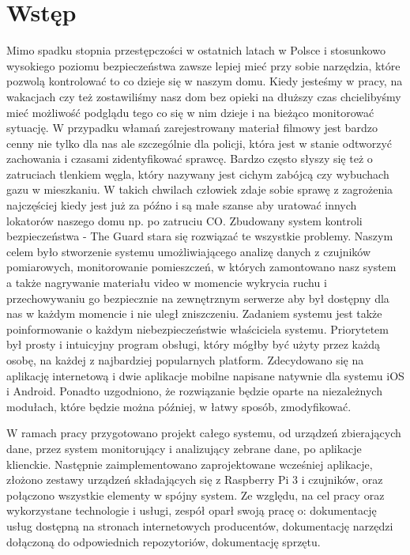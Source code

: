 \chapter{Wstęp}
Mimo spadku stopnia przestępczości w ostatnich latach w Polsce i stosunkowo wysokiego poziomu bezpieczeństwa zawsze lepiej mieć przy sobie narzędzia, które pozwolą kontrolować to co dzieje się w naszym domu. Kiedy jesteśmy w pracy, na wakacjach czy też zostawiliśmy nasz dom bez opieki na dłuższy czas chcielibyśmy mieć możliwość podglądu tego co się w nim dzieje i na bieżąco monitorować sytuację. W przypadku włamań zarejestrowany materiał filmowy jest bardzo cenny nie tylko dla nas ale szczególnie dla policji, która jest w stanie odtworzyć zachowania i czasami zidentyfikować sprawcę.  Bardzo często słyszy się też o zatruciach tlenkiem węgla, który nazywany jest cichym zabójcą czy wybuchach gazu w mieszkaniu. W takich chwilach człowiek zdaje sobie sprawę z zagrożenia najczęściej kiedy jest już za późno i są małe szanse aby uratować innych lokatorów naszego domu np. po zatruciu CO. 
Zbudowany system kontroli bezpieczeństwa - The Guard stara się rozwiązać te wszystkie problemy. Naszym celem było stworzenie systemu umożliwiającego analizę danych z czujników pomiarowych, monitorowanie pomieszczeń, w których zamontowano nasz system a także nagrywanie materiału video w momencie wykrycia ruchu i przechowywaniu go bezpiecznie na zewnętrznym serwerze aby był dostępny dla nas w każdym momencie i nie uległ zniszczeniu. Zadaniem systemu jest także poinformowanie o każdym niebezpieczeństwie właściciela systemu. Priorytetem był prosty i intuicyjny program obsługi, który mógłby być użyty przez każdą osobę, na każdej z najbardziej popularnych platform. Zdecydowano się na aplikację internetową i dwie aplikacje mobilne napisane natywnie dla systemu iOS i Android. Ponadto uzgodniono, że rozwiązanie będzie oparte na niezależnych modułach, które będzie można później, w łatwy sposób, zmodyfikować.

W ramach pracy przygotowano projekt całego systemu, od urządzeń zbierających dane, przez system monitorujący i analizujący zebrane dane, po aplikacje klienckie. Następnie zaimplementowano zaprojektowane wcześniej aplikacje, złożono zestawy urządzeń składających się z Raspberry Pi 3 i czujników, oraz połączono wszystkie elementy w spójny system.
Ze względu, na cel pracy oraz wykorzystane technologie i usługi, zespół oparł swoją pracę o: dokumentację usług dostępną na stronach internetowych producentów, dokumentację narzędzi dołączoną do odpowiednich repozytoriów, dokumentację sprzętu.

